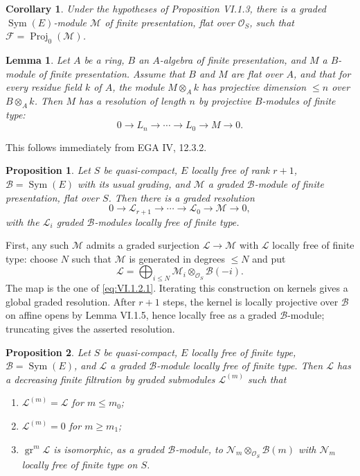 \documentclass[13pt]{extarticle}
\newcommand{\cO}{\mathcal O}
\newcommand{\gr}{\operatorname{gr}}
\newcommand{\Sym}{\operatorname{Sym}}
\newcommand{\Proj}{\operatorname{Proj}}
\newtheorem*{proposition}{Proposition}
\newtheorem*{corollary}{Corollary}
\newtheorem*{lemma}{Lemma}
\begin{document}
\begin{corollary}\label{cor:VI.1.4}
Under the hypotheses of Proposition VI.1.3, there is a graded $\Sym(E)$-module $\mathcal M$ of finite presentation, flat over $\cO_S$, such that $\mathcal F=\Proj_0(\mathcal M)$.
\end{corollary}

\begin{lemma}\label{lem:VI.1.5}
Let $A$ be a ring, $B$ an $A$-algebra of finite presentation, and $M$ a $B$-module of finite presentation. Assume that $B$ and $M$ are flat over $A$, and that for every residue field $k$ of $A$, the module $M\otimes_Ak$ has projective dimension $\leq n$ over $B\otimes_Ak$. Then $M$ has a resolution of length $n$ by projective $B$-modules of finite type:
\[
0\to L_n\to\cdots\to L_0\to M\to 0.
\]
\end{lemma}
This follows immediately from EGA IV, 12.3.2.

\begin{proposition}\label{prop:VI.1.6}
Let $S$ be quasi-compact, $E$ locally free of rank $r+1$, $\mathcal B=\Sym(E)$ with its usual grading, and $\mathcal M$ a graded $\mathcal B$-module of finite presentation, flat over $S$. Then there is a graded resolution
\[
0\to\mathcal L_{r+1}\to\cdots\to\mathcal L_0\to\mathcal M\to 0,
\]
with the $\mathcal L_i$ graded $\mathcal B$-modules locally free of finite type.
\end{proposition}

First, any such $\mathcal M$ admits a graded surjection $\mathcal L\to\mathcal M$ with $\mathcal L$ locally free of finite type: choose $N$ such that $\mathcal M$ is generated in degrees $\leq N$ and put
\[
\mathcal L=\bigoplus_{i\leq N}\mathcal M_i\otimes_{\cO_S}\mathcal B(-i).
\]
The map is the one of \eqref{eq:VI.1.2.1}. Iterating this construction on kernels gives a global graded resolution. After $r+1$ steps, the kernel is locally projective over $\mathcal B$ on affine opens by Lemma VI.1.5, hence locally free as a graded $\mathcal B$-module; truncating gives the asserted resolution.

\begin{proposition}\label{prop:VI.1.7}
Let $S$ be quasi-compact, $E$ locally free of finite type, $\mathcal B=\Sym(E)$, and $\mathcal L$ a graded $\mathcal B$-module locally free of finite type. Then $\mathcal L$ has a decreasing finite filtration by graded submodules $\mathcal L^{(m)}$ such that
\begin{enumerate}[label=(\roman*)]
\item $\mathcal L^{(m)}=\mathcal L$ for $m\leq m_0$;
\item $\mathcal L^{(m)}=0$ for $m\geq m_1$;
\item $\gr^m\mathcal L$ is isomorphic, as a graded $\mathcal B$-module, to $\mathcal N_m\otimes_{\cO_S}\mathcal B(m)$ with $\mathcal N_m$ locally free of finite type on $S$.
\end{enumerate}
\end{proposition}
\end{document}
